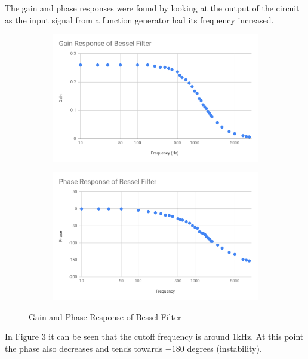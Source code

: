 \documentclass[12pt]{article}
\begin{document}
		The gain and phase responses were found by looking at the output of the circuit as the input signal from a function generator had its frequency increased.\\
		
		\begin{figure}[h!]
			\centering
			\begin{subfigure}[b]{0.45\textwidth}
				\centering
				\includegraphics[width=\textwidth]{bessel_gain}
			\end{subfigure}
			\hfill
			\begin{subfigure}[b]{0.45\textwidth}
				\centering
				\includegraphics[width=\textwidth]{bessel_phase}
			\end{subfigure}
			\caption{Gain and Phase Response of Bessel Filter}
		\end{figure}
		
		In Figure 3 it can be seen that the cutoff frequency is around 1kHz. At this point the phase also decreases and tends towards $-180$ degrees (instability).
		
\end{document}
